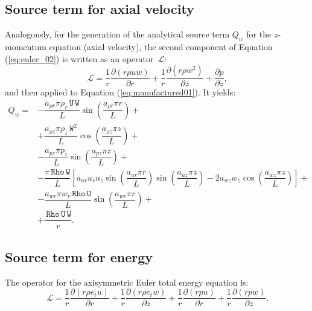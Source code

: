 \documentclass[10pt]{article}
\newcommand{\Diff}[2] {\dfrac{\partial( #1)}{\partial #2}}
\newcommand{\diff}[2] {\dfrac{\partial #1}{\partial #2}}
\newcommand{\Lo}{\,\mathcal{L}}
\newcommand{\Rho}{\,\mathtt{Rho}}
\newcommand{\U}{\,\mathtt{U}}
\newcommand{\W}{\,\mathtt{W}}
\begin{document}
\subsection{Source term for axial velocity}
Analogously, for the generation of the analytical source term $Q_w$ for the $z$-momentum equation (axial velocity), the second component of Equation  (\ref{eq:euler_02})  is written as an  operator $\Lo$:
\begin{equation*}
   \Lo = \dfrac{1}{r}\Diff{r \rho u w  }{r}+ \dfrac{1}{r}\Diff{r \rho w^2 }{z}+\diff{p}{z} ,
\end{equation*}
and then applied to Equation  (\ref{eq:manufactured01}). It yields:
\begin{equation}
 \begin{split}
 \displaystyle
Q_w  =
&-\dfrac{a_{\rho r} \pi \rho_r \U \W }{L}\sin\left(\dfrac{a_{\rho r} \pi r}{L}\right)+ \\
&+\dfrac{a_{\rho z} \pi \rho_z \W^2 }{L}\cos\left(\dfrac{a_{\rho z} \pi z}{L}\right)+ \\
&-\dfrac{a_{pz} \pi p_z }{L}\sin\left(\dfrac{a_{pz} \pi z}{L}\right)+ \\
&-\dfrac{\pi \Rho \W}{L}\left[a_{ur} u_r u_z \sin\left(\dfrac{a_{ur} \pi r}{L}\right) \sin\left(\dfrac{a_{uz} \pi z}{L}\right)-2 a_{wz} w_z \cos\left(\dfrac{a_{wz} \pi z}{L}\right)\right] + \\
&-\dfrac{a_{wr} \pi w_r \Rho \U }{L}\sin\left(\dfrac{a_{wr} \pi r}{L}\right)+ \\
&+\dfrac{\Rho \U \W}{r}  .
\end{split}
\end{equation}



\subsection{Source term for energy}

The operator for the axisymmetric Euler total energy equation is:
\begin{equation*}
 \Lo= \dfrac{1}{r}\Diff{r \rho e_t u}{ r}+\dfrac{1}{r}\Diff{r \rho e_t w}{z} +\dfrac{1}{r}\Diff{r p  u}{ r}+\dfrac{1}{r}\Diff{r p w}{z}.
\end{equation*}
\end{document}
